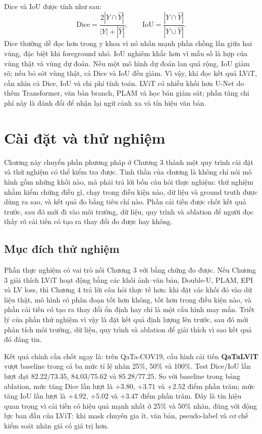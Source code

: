 Dice và IoU được tính như sau:
\[
\mathrm{Dice}=\frac{2|Y\cap \hat{Y}|}{|Y|+|\hat{Y}|},
\qquad
\mathrm{IoU}=\frac{|Y\cap \hat{Y}|}{|Y\cup \hat{Y}|}.
\]
Dice thường dễ đọc hơn trong y khoa vì nó nhấn mạnh phần chồng lấn giữa hai vùng, đặc biệt khi foreground nhỏ. IoU nghiêm khắc hơn vì mẫu số là hợp của vùng thật và vùng dự đoán. Nếu một mô hình dự đoán lan quá rộng, IoU giảm rõ; nếu bỏ sót vùng thật, cả Dice và IoU đều giảm. Vì vậy, khi đọc kết quả LViT, cần nhìn cả Dice, IoU và chi phí tính toán. LViT có nhiều khối hơn U-Net do thêm Transformer, văn bản branch, PLAM và học bán giám sát; phần tăng chi phí này là đánh đổi để nhận lại ngữ cảnh xa và tín hiệu văn bản.

\chapter{Cài đặt và thử nghiệm}
\label{sec:experiment}

Chương này chuyển phần phương pháp ở Chương 3 thành một quy trình cài đặt và thử nghiệm có thể kiểm tra được. Tinh thần của chương là không chỉ nói mô hình gồm những khối nào, mà phải trả lời bốn câu hỏi thực nghiệm: thử nghiệm nhằm kiểm chứng điều gì, chạy trong điều kiện nào, dữ liệu và ground truth được dùng ra sao, và kết quả đo bằng tiêu chí nào. Phần cải tiến được chốt kết quả trước, sau đó mới đi vào môi trường, dữ liệu, quy trình và ablation để người đọc thấy rõ cải tiến có tạo ra thay đổi đo được hay không.

\section{Mục đích thử nghiệm}

Phần thực nghiệm có vai trò nối Chương 3 với bằng chứng đo được. Nếu Chương 3 giải thích LViT hoạt động bằng các khối ảnh--văn bản, Double-U, PLAM, EPI và LV loss, thì Chương 4 trả lời câu hỏi thực tế hơn: khi đặt các khối đó vào dữ liệu thật, mô hình có phân đoạn tốt hơn không, tốt hơn trong điều kiện nào, và phần cải tiến có tạo ra thay đổi ổn định hay chỉ là một cấu hình may mắn. Triết lý của phần thử nghiệm vì vậy là đặt kết quả định lượng lên trước, sau đó mới phân tích môi trường, dữ liệu, quy trình và ablation để giải thích vì sao kết quả đó đáng tin.

Kết quả chính cần chốt ngay là: trên QaTa-COV19, cấu hình cải tiến \textbf{QaTaLViT} vượt baseline trong cả ba mức tỉ lệ nhãn 25\%, 50\% và 100\%. Test Dice/IoU lần lượt đạt \(82.22/73.35\), \(84.03/75.62\) và \(85.28/77.25\). So với baseline trong bảng ablation, mức tăng Dice lần lượt là \(+3.80\), \(+3.71\) và \(+2.52\) điểm phần trăm; mức tăng IoU lần lượt là \(+4.92\), \(+5.02\) và \(+3.47\) điểm phần trăm. Đây là tín hiệu quan trọng vì cải tiến có hiệu quả mạnh nhất ở 25\% và 50\% nhãn, đúng với động lực ban đầu của LViT: khi mask chuyên gia ít, văn bản, pseudo-label và cơ chế kiểm soát nhãn giả có giá trị hơn.

